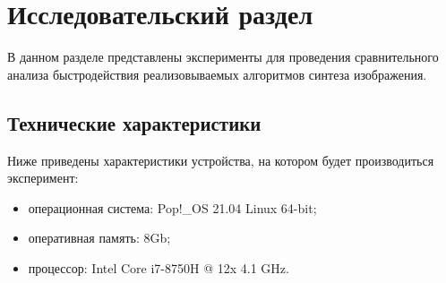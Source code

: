 \chapter{Исследовательский раздел}

В данном разделе представлены эксперименты для проведения сравнительного анализа быстродействия реализовываемых алгоритмов синтеза изображения.

\section{Технические характеристики}

Ниже приведены характеристики устройства, на котором будет производиться эксперимент:

\begin{itemize}
    \item операционная система: Pop!\_OS 21.04 \cite{pop} Linux 64-bit;
    \item оперативная память: 8Gb;
    \item процессор: Intel Core i7-8750H @ 12x 4.1 GHz.
\end{itemize}
